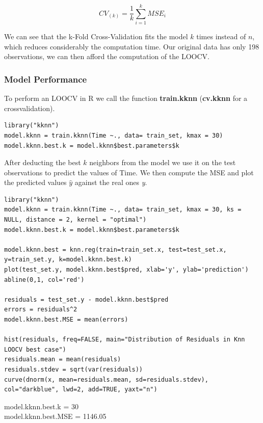 \documentclass[]{report}
\begin{document}
\begin{center}
	$$CV_{(k)} = \frac{1}{k} \sum_{i=1}^{k} MSE_{i} $$
\end{center}

We can see that the k-Fold Cross-Validation fits the model $k$ times instead of $n$, which reduces considerably the computation time. Our original data has only 198 observations, we can then afford the computation of the LOOCV. \\

\subsubsection{Model Performance}
To perform an LOOCV in R we call the function \textbf{train.kknn} (\textbf{cv.kknn} for a crossvalidation).
\begin{lstlisting}
library("kknn")
model.kknn = train.kknn(Time ~., data= train_set, kmax = 30)
model.kknn.best.k = model.kknn$best.parameters$k
\end{lstlisting}

After deducting the best $k$ neighbors from the model we use it on the test observations to predict the values of Time. 
We then compute the MSE and plot the predicted values $\hat{y}$ against the real ones \textit{y}.

\begin{lstlisting}
library("kknn")
model.kknn = train.kknn(Time ~., data= train_set, kmax = 30, ks = NULL, distance = 2, kernel = "optimal")
model.kknn.best.k = model.kknn$best.parameters$k

model.kknn.best = knn.reg(train=train_set.x, test=test_set.x, y=train_set.y, k=model.kknn.best.k)
plot(test_set.y, model.kknn.best$pred, xlab='y', ylab='prediction')
abline(0,1, col='red')

residuals = test_set.y - model.kknn.best$pred
errors = residuals^2
model.kknn.best.MSE = mean(errors)

hist(residuals, freq=FALSE, main="Distribution of Residuals in Knn LOOCV best case")
residuals.mean = mean(residuals)
residuals.stdev = sqrt(var(residuals))
curve(dnorm(x, mean=residuals.mean, sd=residuals.stdev), col="darkblue", lwd=2, add=TRUE, yaxt="n")
\end{lstlisting}

\begin{center} 
	model.kknn.best.k  = 30 \\
	model.kknn.best.MSE = 1146.05
\end{center}
\end{document}
